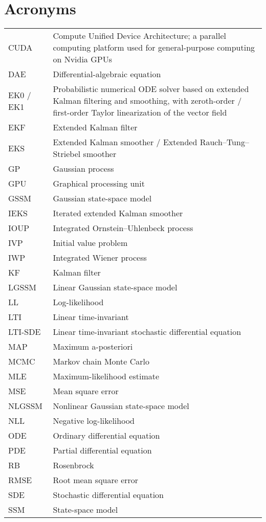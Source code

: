 \documentclass{mimosis}
\begin{document}
\chapter*{Acronyms}
\label{sec:org5750891}
\begin{longtable}{p{.2\linewidth}p{.8\linewidth}}
CUDA & Compute Unified Device Architecture; a parallel computing platform used for general-purpose computing on Nvidia GPUs \\
DAE & Differential-algebraic equation \\
EK0 / EK1 & Probabilistic numerical ODE solver based on extended Kalman filtering and smoothing, with zeroth-order / first-order Taylor linearization of the vector field \\
EKF & Extended Kalman filter \\
EKS & Extended Kalman smoother / Extended Rauch--Tung--Striebel smoother \\
GP & Gaussian process \\
GPU & Graphical processing unit \\
GSSM & Gaussian state-space model \\
IEKS & Iterated extended Kalman smoother \\
IOUP & Integrated Ornstein--Uhlenbeck process \\
IVP & Initial value problem \\
IWP & Integrated Wiener process \\
KF & Kalman filter \\
LGSSM & Linear Gaussian state-space model \\
LL & Log-likelihood \\
LTI & Linear time-invariant \\
LTI-SDE & Linear time-invariant stochastic differential equation \\
MAP & Maximum a-posteriori \\
MCMC & Markov chain Monte Carlo \\
MLE & Maximum-likelihood estimate \\
MSE & Mean square error \\
NLGSSM & Nonlinear Gaussian state-space model \\
NLL & Negative log-likelihood \\
ODE & Ordinary differential equation \\
PDE & Partial differential equation \\
RB & Rosenbrock \\
RMSE & Root mean square error \\
SDE & Stochastic differential equation \\
SSM & State-space model \\
\end{longtable}
\end{document}
